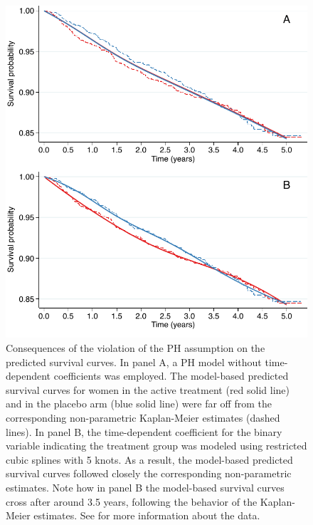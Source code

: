 \begin{figure}[p]
\begin{center}
\includegraphics[width=\linewidth]{figures/phnophsurvcurve.pdf}
\end{center}
\caption[Survival curves from proportional-hazards models]{Consequences of the violation of the PH assumption on the predicted survival curves. In panel A, a PH model without time-dependent coefficients was employed. The model-based predicted survival curves for women in the active treatment (red solid line) and in the placebo arm (blue solid line) were far off from the corresponding non-parametric Kaplan-Meier estimates (dashed lines). In panel B, the time-dependent coefficient for the binary variable indicating the treatment group was modeled using restricted cubic splines with 5 knots. As a result, the model-based predicted survival curves  followed closely the corresponding non-parametric estimates. Note how in panel B the model-based survival curves cross after around 3.5 years, following the behavior of the Kaplan-Meier estimates. See \citet{hulley_randomized_1998} for more information about the data.}
\label{fig:phnophsurvcurve}
\end{figure}

